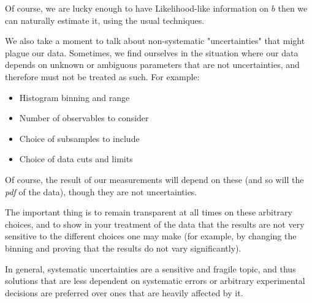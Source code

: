Of course, we are lucky enough to have Likelihood-like information on $b$ then we can naturally estimate it, using the usual techniques. 

We also take a moment to talk about non-systematic "uncertainties" that might plague our data. Sometimes, we find ourselves in the situation where our data depends on unknown or ambiguous parameters that are not uncertainties, and therefore must not be treated as such. For example:
\begin{itemize}
	\item Histogram binning and range
	\item Number of observables to consider
	\item Choice of subsamples to include
	\item Choice of data cuts and limits
\end{itemize}

Of course, the result of our measurements will depend on these (and so will the \emph{pdf} of the data), though they are not uncertainties. 

The important thing is to remain transparent at all times on these arbitrary choices, and to show in your treatment of the data that the results are not very sensitive to the different choices one may make (for example, by changing the binning and proving that the results do not vary significantly).

In general, systematic uncertainties are a sensitive and fragile topic, and thus solutions that are less dependent on systematic errors or arbitrary experimental decisions are preferred over ones that are heavily affected by it.